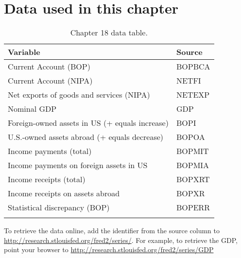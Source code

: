 \section*{Data used in this chapter}
\begin{table}[htb]
\centering
\caption{Chapter 18 data table.}
\begin{tabular*}{0.9\textwidth}{l@{\extracolsep{\fill}}l}
\toprule
Variable & Source\\
\midrule
Current Account (BOP)    &BOPBCA\\
Current Account (NIPA)    &NETFI\\
Net exports of goods and services (NIPA)    &NETEXP\\
Nominal GDP    & GDP\\
Foreign-owned assets in US (+ equals increase)    &BOPI\\
U.S.-owned assets abroad (+ equals decrease)    &BOPOA\\
Income payments (total)    &BOPMIT\\
Income payments on foreign assets in US    &BOPMIA\\
Income receipts (total)    &BOPXRT\\
Income receipts on assets abroad    &BOPXR\\
Statistical discrepancy (BOP)    &BOPERR\\
\bottomrule
\addlinespace
\end{tabular*}
\begin{minipage}{0.9\textwidth}
\footnotesize{To retrieve the data online, add the identifier from the source column to \url{http://research.stlouisfed.org/fred2/series/}.  For example, to retrieve the GDP, point your browser to \url{http://research.stlouisfed.org/fred2/series/GDP}}
\end{minipage}
\end{table}
